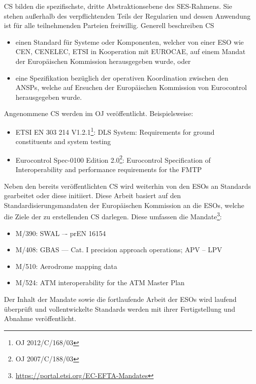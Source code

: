 
    \acf{CS} bilden die spezifischste, dritte Abstraktionsebene des \ac{SES}-Rahmens.
    Sie stehen außerhalb des verpflichtenden Teils der Regularien und dessen Anwendung ist für alle teilnehmenden Parteien freiwillig. 
    Generell beschreiben \ac{CS}
    
    \begin{itemize}
        \item einen Standard für Systeme oder Komponenten, welcher von einer \ac{ESO} wie \ac{CEN}, \ac{CENELEC}, \ac{ETSI} in Kooperation mit \ac{EUROCAE}, auf einem Mandat der Europäischen Kommission herausgegeben wurde, oder
        \item eine Spezifikation bezüglich der operativen Koordination zwischen den \acp{ANSP}, welche auf Ersuchen der Europäischen Kommission von Eurocontrol herausgegeben wurde.
    \end{itemize}

    \noindent
    Angenommene \ac{CS} werden im \ac{OJ} veröffentlicht.
    Beispielsweise:

    \begin{itemize}
        \item \ac{ETSI} EN 303 214 V1.2.1\footnote{\ac{OJ} 2012/C/168/03}: 
            \acf{DLS} System: Requirements for ground constituents and system testing
        \item Eurocontrol Spec-0100 Edition 2.0\footnote{\ac{OJ} 2007/C/188/03}:
            Eurocontrol Specification of Interoperability and performance requirements for the \acf{FMTP}
    \end{itemize}
    
    \noindent
    Neben den bereits veröffentlichten \ac{CS} wird weiterhin von den \acp{ESO} an Standards gearbeitet oder diese initiiert. 
    Diese Arbeit basiert auf den Standardisierungsmandaten der Europäischen Kommission an die \acp{ESO}, welche die Ziele der zu erstellenden \ac{CS} darlegen.
    Diese umfassen die Mandate\footnote{\href{https://portal.etsi.org/EC-EFTA-Mandates}{https://portal.etsi.org/EC-EFTA-Mandates}}:
    \begin{itemize}
        \item M/390: \acf{SWAL} –- prEN 16154
        \item M/408: \acf{GBAS} --- Cat. I precision approach operations; \ac{APV} – \ac{LPV}
        \item M/510: Aerodrome mapping data
        \item M/524: \acf{ATM} interoperability for the ATM Master Plan
    \end{itemize}
    
    Der Inhalt der Mandate sowie die fortlaufende Arbeit der ESOs wird laufend überprüft und vollentwickelte Standards werden mit ihrer Fertigstellung und Abnahme veröffentlicht.
    